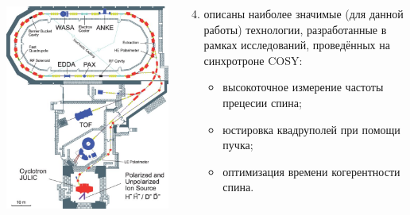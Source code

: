 \documentclass[14pt]{beamer}
\begin{document}
\begin{frame}
	\begin{columns}
		\begin{column}{.55\linewidth}
			\includegraphics[width=\linewidth]{COSY_Facility}
		\end{column}
		\begin{column}{.5\linewidth}
			\begin{enumerate}\setcounter{enumi}{3}
				\item описаны наиболее значимые (для данной работы) технологии, 
				разработанные в рамках исследований, проведённых на синхротроне COSY:
				\begin{itemize}
					\item высокоточное измерение частоты прецесии спина;%
					\item юстировка квадруполей при помощи пучка;%
					\item оптимизация времени когерентности спина.%
				\end{itemize}
			\end{enumerate}
		\end{column}
	\end{columns}
\end{frame}
\end{document}
